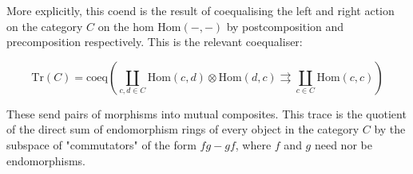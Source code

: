 \documentclass[10pt]{article}
\theoremstyle{plain}%
\theoremstyle{definition}
\theoremstyle{remark}
\begin{document}
More explicitly, this coend is the result of coequalising the left and right action on the category $C$ on the hom $\mathrm{Hom(-,-)}$ by postcomposition and precomposition respectively. This is the relevant coequaliser:

\begin{equation}
	\mathrm{Tr}(C) = \mathrm{coeq}
	\left(
		\coprod_{c, d \in C} \mathrm{Hom}(c,d)
		\otimes
		\mathrm{Hom}(d,c)
		\rightrightarrows 
		\coprod_{c \in C}
		\mathrm{Hom}(c,c)
	\right)
\end{equation}

These send pairs of morphisms into mutual composites. This trace is the quotient of the direct sum of endomorphism rings of every object in the category $C$ by the subspace of 
"commutators" of the form $fg - gf$, where $f$ and $g$ need nor be endomorphisms.
\end{document}
